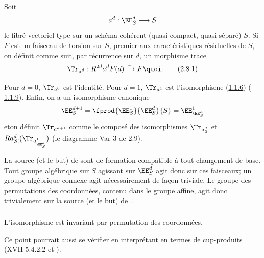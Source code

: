 \subsection{}
Soit
$$
a^{d}:\EE^{d}_{S}\longrightarrow S
$$
le fibré vectoriel type sur un schéma cohérent (\ie quasi-compact,
quasi-séparé) $S$. Si $F$ est un faisceau de torsion sur $S$, premier
aux caractéristiques résiduelles de $S$, on définit comme suit, par
récurrence sur $d$, un morphisme trace
\begin{equation*}
\Tr_{a^d}:R^{2d}a^{d}_{!}F(d)\xrightarrow{\sim} F{\quoi}.\tag{2.8.1}
\end{equation*}

Pour $d=0$, $\Tr_{a^0}$ est l'identité. Pour $d=1$, $\Tr_{a^1}$
est l'isomorphisme (\hyperref[XVIII.prop1.1.6]{1.1.6}) (\cf
\hyperref[XVIII.lem1.1.9]{1.1.9}). Enfin, on a un isomorphisme canonique
$$
\EE^{d+1}_{S}=\fprod{\EE^{1}_{S}}{\EE^{d}_{S}}{S}=\EE^{1}_{\EE_{S}^d}
$$
et\pageoriginale on définit $\Tr_{a^{d+1}}$ comme le composé des
isomorphismes $\Tr_{a^{d}_{S}}$ et
$Ra^{d}_{S!}(\Tr_{a^1_{\EE^d_S}})$
(\cf le diagramme Var 3 de \hyperref[XVIII.thm2.9]{2.9}).

La source (et le but) de  sont de formation compatible à tout
changement de base. Tout groupe algébrique sur $S$ agissant sur
$\EE^{d}_{S}$ agit donc sur ces faisceaux; un groupe algébrique
connexe agit nécessairement de façon triviale. Le groupe des
permutations des coordonnées, contenu dans le groupe affine, agit donc
trivialement sur la source (et le but) de .

\setcounter{subsubsection}{1}
\subsubsection{}
L'isomorphisme  est invariant par permutation des
coordonnées. 

Ce point pourrait aussi se vérifier en interprétant
 en termes 
de cup-produits (XVII 5.4.2.2 et ).

